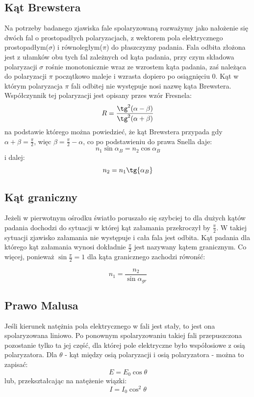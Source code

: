 \documentclass[a4paper,10pt]{article}
\begin{document}
\subsection{Kąt Brewstera}
Na potrzeby badanego zjawiska fale spolaryzowaną rozważymy jako nałożenie się dwóch fal o prostopadłych polaryzacjach, z wektorem
pola elektrycznego prostopadłym($\sigma$) i równoległym($\pi$) do płaszczyzny padania. Fala odbita złożona jest z ułamków obu tych fal zależnych
od kąta padania, przy czym składowa polaryzacji $\sigma$ rośnie monotonicznie wraz ze wzrostem kąta padania, zaś należąca do polaryzacji $\pi$
początkowo maleje i wzrasta dopiero po osiągnięciu 0. Kąt w którym polaryzacja $\pi$ fali odbitej nie występuje nosi nazwę kąta Brewstera.
Współczynnik tej polaryzacji jest opisany przes wzór Fresnela:
\begin{equation}
  R = \frac{\tg^2({\alpha - \beta})}{\tg^2({\alpha + \beta})}
\end{equation}
na podstawie którego można powiedzieć, że kąt Brewstera przypada gdy $\alpha + \beta=\frac{\pi}{2}$, więc $\beta = \frac{\pi}{2}-\alpha$, co
po podstawieniu do prawa Snella daje:
\begin{equation}
  n_1 \sin{\alpha_B} = n_2 \cos{\alpha_B}
\end{equation}
i dalej:
\begin{equation}
  n_2 = n_1 \tg{\alpha_B}
\end{equation}
\subsection{Kąt graniczny}
Jeżeli w pierwotnym ośrodku światło poruszało się szybciej to dla dużych kątów padania dochodzi do sytuacji
w której kąt załamania przekroczył by $\frac{\pi}{2}$. W takiej sytuacji zjawisko załamania nie występuje i cała fala jest odbita.
Kąt padania dla którego kąt załamania wynosi dokładnie $\frac{\pi}{2}$ jest nazywany kątem granicznym. Co więcej, ponieważ $\sin{\frac{\pi}{2}} = 1$
dla kąta granicznego zachodzi rówonść:

\begin{equation}
 n_1 = \frac{n_2}{\sin{\alpha_{gr}}}
\end{equation}
\subsection{Prawo Malusa}
Jeśli kierunek natężnia pola elektrycznego w fali jest stały, to jest ona spolaryzowana liniowo. Po ponownym spolaryzowaniu takiej fali
przepuszczona pozostanie tylko ta jej część, dla której pole elektryczne było współosiowe z osią polaryzatora. Dla $\theta$ - kąt między osią
polaryzacji i osią polaryzatora - można to zapisać:
\begin{equation}
  E = E_0 \cos{\theta}
\end{equation}
lub, przekształcając na natężenie wiązki:
\begin{equation}
  I=I_0 \cos^2{\theta}
\end{equation}
\end{document}
